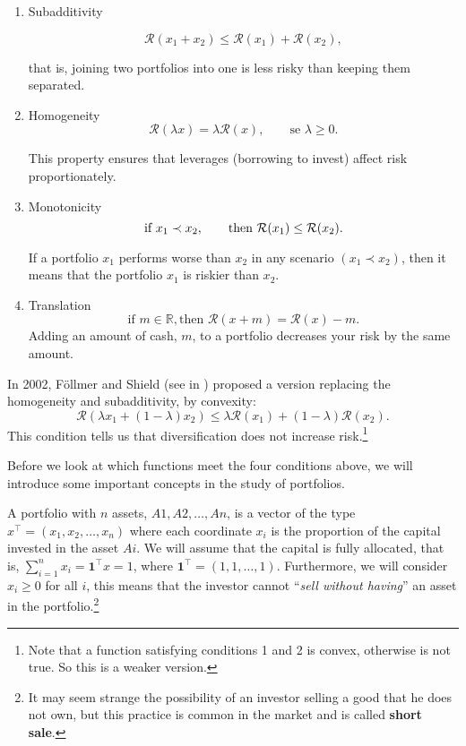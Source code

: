 \begin{enumerate}
	\item Subadditivity

	      \[
		      \mathcal{R}(x_1+x_2) \leq \mathcal{R}(x_1) + \mathcal{R}(x_2),
	      \]

	      that is, joining two portfolios into one is less risky than keeping them
	      separated.


	\item Homogeneity
	      \[
		      \mathcal{R}(\lambda x) = \lambda \mathcal{R}(x), \qquad \mbox{se } \lambda
		      \geq 0.
	      \]

	      This property ensures that leverages (borrowing to invest) affect risk proportionately.

	\item Monotonicity
	      \[
		      \mbox{if } x_1 \prec x_2, \qquad \mbox{then } \mathcal{R}(x_1) \leq \mathcal{R}(x_2).\\
	      \]

	      If a portfolio $x_1$ performs worse than $x_2$ in any
	      scenario $(x_1 \prec x_2)$, then it means that the portfolio $x_1$ is
	      riskier than $x_2$.

	\item Translation
	      \[
		      \mbox{if } m\in\mathbb{R}, \mbox{then } \mathcal{R}(x+m) = \mathcal{R}(x)-m.
	      \]
	      Adding an amount of cash, $m$, to a portfolio decreases your risk by the same amount.
\end{enumerate}


In 2002, Föllmer and Shield (see in \cite{Follmer2002}) proposed a version replacing the
homogeneity and subadditivity, by convexity:
\[
	\mathcal{R}(\lambda x_1 + (1-\lambda)x_2) \leq \lambda \mathcal{R}(x_1) + (1-\lambda) \mathcal{R}(x_2).
\]
This condition tells us that diversification does not increase risk.\footnote{Note that a function satisfying conditions 1 and 2 is convex, otherwise is not true. So this is a weaker version.}

Before we look at which functions meet the four conditions above,
we will introduce some important concepts in the study of portfolios.

A portfolio with $n$ assets, $A1, A2, \dots, An$, is a vector of the type
$x^\top = (x_1, x_2, \dots, x_n)$ where each coordinate $x_i$ is the
proportion of the capital invested in the asset $Ai$. We will assume that the capital
is fully allocated, that is, $\sum_{i=1}^n x_i = \textbf{1}^\top x=1$, where
$ \mathbf{1}^\top= (1,1,\dots,1)$. Furthermore, we will consider $x_i\geq 0$ for all $i$, this means that the investor cannot ``\textit{sell without having}'' an asset in the portfolio.\footnote{It may seem strange the possibility of an investor selling a good that he does not own, but this practice is common in the market and is called \textbf{short sale}.}


